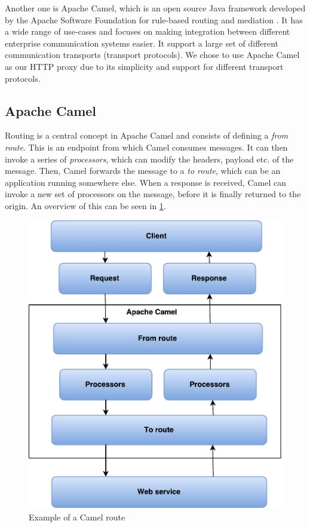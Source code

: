 Another one is Apache Camel, which is an open source Java framework developed by
the Apache Software Foundation for rule-based routing and
mediation \cite{camel-homepage}. It has a wide range of use-cases and focuses on
making integration between different enterprise communication systems easier. It
support a large set of different communication transports (transport protocols).
We chose to use Apache Camel as our HTTP proxy due to its simplicity and support
for different transport protocols.

\subsection{Apache Camel}

Routing is a central concept in Apache Camel and consists of defining a
\textit{from route}. This is an endpoint from which Camel consumes messages. It
can then invoke a series of \textit{processors}, which can modify the headers,
payload etc. of the message. Then, Camel forwards the message to a \textit{to
route}, which can be an application running somewhere else. When a response is
received, Camel can invoke a new set of processors on the message, before it is
finally returned to the origin. An overview of this can be seen in
\cref{figure:camel-route}.

\begin{figure}[h]
\centering
\includegraphics[scale=0.7]{images/camel_routes.pdf}
\caption{Example of a Camel route}
\label{figure:camel-route}
\end{figure}

